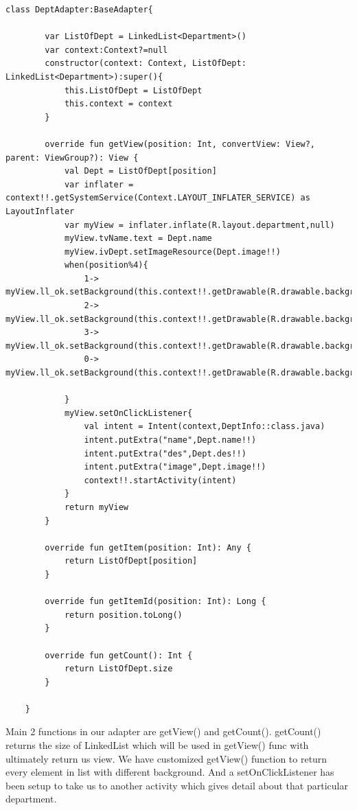 \documentclass[11pt,a4paper]{report}
\begin{document}
\vspace{10pt}
\begin{lstlisting}[caption=Defining adapter in MainActivity.kt]
  class DeptAdapter:BaseAdapter{

        var ListOfDept = LinkedList<Department>()
        var context:Context?=null
        constructor(context: Context, ListOfDept: LinkedList<Department>):super(){
            this.ListOfDept = ListOfDept
            this.context = context
        }

        override fun getView(position: Int, convertView: View?, parent: ViewGroup?): View {
            val Dept = ListOfDept[position]
            var inflater = context!!.getSystemService(Context.LAYOUT_INFLATER_SERVICE) as LayoutInflater
            var myView = inflater.inflate(R.layout.department,null)
            myView.tvName.text = Dept.name
            myView.ivDept.setImageResource(Dept.image!!)
            when(position%4){
                1-> myView.ll_ok.setBackground(this.context!!.getDrawable(R.drawable.background2))
                2-> myView.ll_ok.setBackground(this.context!!.getDrawable(R.drawable.background4))
                3-> myView.ll_ok.setBackground(this.context!!.getDrawable(R.drawable.background))
                0-> myView.ll_ok.setBackground(this.context!!.getDrawable(R.drawable.background3))

            }
            myView.setOnClickListener{
                val intent = Intent(context,DeptInfo::class.java)
                intent.putExtra("name",Dept.name!!)
                intent.putExtra("des",Dept.des!!)
                intent.putExtra("image",Dept.image!!)
                context!!.startActivity(intent)
            }
            return myView
        }

        override fun getItem(position: Int): Any {
            return ListOfDept[position]
        }

        override fun getItemId(position: Int): Long {
            return position.toLong()
        }

        override fun getCount(): Int {
            return ListOfDept.size
        }

    }
\end{lstlisting}

Main 2 functions in our adapter are  getView() and getCount().
getCount() returns the size of LinkedList which will be used in getView() func 
with ultimately return us view.
We have customized getView() function to return every element in list with different
background.
And a setOnClickListener has been setup to take us to another activity which gives detail 
about that particular department.
\end{document}
